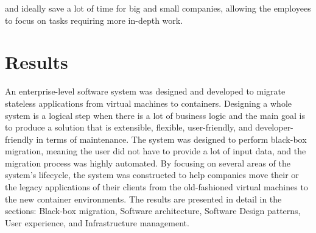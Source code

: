 \documentclass{article}
\begin{document}
\begin{multicols}{2}
and ideally save a lot of time for big and small companies, allowing the employees to focus on tasks requiring more in-depth work.

\section{Results}
An enterprise-level software system was designed and developed to migrate stateless applications from virtual machines to containers. Designing a whole system is a logical step when there is a lot of business logic and the main goal is to produce a solution that is extensible, flexible, user-friendly, and developer-friendly in terms of maintenance. The system was designed to perform black-box migration, meaning the user did not have to provide a lot of input data, and the migration process was highly automated. By focusing on several areas of the system's lifecycle, the system was constructed to help companies move their or the legacy applications of their clients from the old-fashioned virtual machines to the new container environments. The results are presented in detail in the sections: Black-box migration, Software architecture, Software Design patterns, User experience, and Infrastructure management.


\end{multicols}
\end{document}

